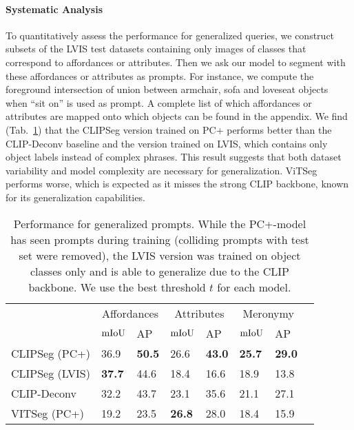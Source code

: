 \documentclass[10pt,twocolumn,letterpaper]{article}
\begin{document}
\paragraph{Systematic Analysis}
To quantitatively assess the performance for generalized queries, we construct subsets of the LVIS test datasets containing only images of classes that correspond to affordances or attributes.
Then we ask our model to segment with these affordances or attributes as prompts. For instance, we compute the foreground intersection of union between armchair, sofa and loveseat objects when ``sit on'' is used as prompt.
A complete list of which affordances or attributes are mapped onto which objects can be found in the appendix.
We find (Tab.~\ref{tab:generalize}) that the CLIPSeg version trained on PC+ performs better than the CLIP-Deconv baseline and the version trained on LVIS, which contains only object labels instead of complex phrases. This result suggests that both dataset variability and model complexity are necessary for generalization. 
ViTSeg performs worse, which is expected as it misses the strong CLIP backbone, known for its generalization capabilities.



\begin{table}
    \centering
    \footnotesize
    \begin{tabular}{llllllll}
        \toprule
         & \multicolumn{2}{c}{Affordances} & \multicolumn{2}{c}{Attributes} & \multicolumn{2}{c}{Meronymy}  \\
        &  $\text{mIoU}$ &  AP & $\text{mIoU}$ & AP & $\text{mIoU}$  & AP \\
        \midrule
CLIPSeg (PC+) & 36.9 & \textbf{50.5} & 26.6 & \textbf{43.0} & \textbf{25.7} & \textbf{29.0} \\ 
CLIPSeg (LVIS)  & \textbf{37.7} & 44.6 & 18.4 & 16.6 & 18.9 & 13.8 \\ 
CLIP-Deconv & 32.2 & 43.7 & 23.1 & 35.6 & 21.1 & 27.1 \\ 
VITSeg (PC+) & 19.2 & 23.5 & \textbf{26.8} & 28.0 & 18.4 & 15.9 \\
         \bottomrule
    \end{tabular}\caption{Performance for generalized prompts. While the PC+-model has seen prompts during training (colliding prompts with test set were removed), the LVIS version was trained on object classes only and is able to generalize due to the CLIP backbone. We use the best threshold $t$ for each model.}
    \label{tab:generalize}
\end{table}
\end{document}
